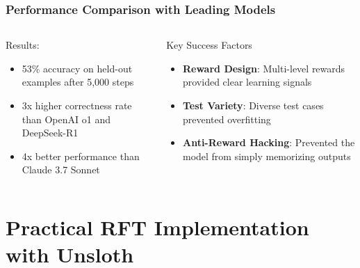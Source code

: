 \documentclass[aspectratio=169]{beamer}
\begin{document}
\begin{frame}[shrink=15]
	\frametitle{Performance Comparison with Leading Models}
	\begin{columns}[T]
		\begin{column}{0.48\textwidth}
			\begin{block}{Results:}
				\begin{itemize}\setlength{\itemsep}{0.3em}
					\item 53\% accuracy on held-out examples after 5,000 steps
					\item 3x higher correctness rate than OpenAI o1 and DeepSeek-R1
					\item 4x better performance than Claude 3.7 Sonnet
				\end{itemize}
			\end{block}
		\end{column}
		\begin{column}{0.48\textwidth}
			\begin{block}{Key Success Factors}
				\begin{itemize}\setlength{\itemsep}{0.3em}
					\item \textbf{Reward Design}: Multi-level rewards provided clear learning signals
					\item \textbf{Test Variety}: Diverse test cases prevented overfitting
					\item \textbf{Anti-Reward Hacking}: Prevented the model from simply memorizing outputs
				\end{itemize}
			\end{block}
		\end{column}
	\end{columns}
\end{frame}

\section{Practical RFT Implementation with Unsloth}
\end{document}
